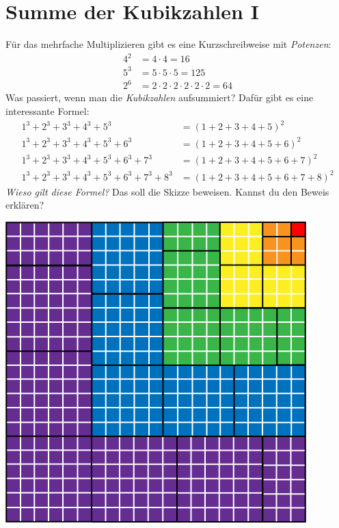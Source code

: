 \documentclass[a5paper,ngerman,landscape,11pt]{scrartcl}
\begin{document}
\section*{Summe der Kubikzahlen I}
Für das mehrfache Multiplizieren gibt es eine Kurzschreibweise mit \emph{Potenzen}:
\begin{align*}
  4^2 &= 4 \cdot 4 = 16 \\
  5^3 &= 5 \cdot 5 \cdot 5 = 125 \\
  2^6 &= 2 \cdot 2 \cdot 2 \cdot 2 \cdot 2 \cdot 2 = 64
\end{align*}
Was passiert, wenn man die \emph{Kubikzahlen} aufsummiert? Dafür gibt es
eine interessante Formel:
\begin{align*}
  1^3 + 2^3 + 3^3 + 4^3 + 5^3 \phantom{{} + 6^3 + 7^3 + 8^3} &= (1 + 2 + 3 + 4 + 5)^2 \\
  1^3 + 2^3 + 3^3 + 4^3 + 5^3 + 6^3 \phantom{{} + 7^3 + 8^3} &= (1 + 2 + 3 + 4 + 5 + 6)^2 \\
  1^3 + 2^3 + 3^3 + 4^3 + 5^3 + 6^3 + 7^3 \phantom{{} + 8^3} &= (1 + 2 + 3 + 4 + 5 + 6 + 7)^2 \\
  1^3 + 2^3 + 3^3 + 4^3 + 5^3 + 6^3 + 7^3 + 8^3 &= (1 + 2 + 3 + 4 + 5 + 6 + 7 + 8)^2
\end{align*}
\emph{Wieso gilt diese Formel?} Das soll die Skizze beweisen. Kannst du den
Beweis erklären?
\begin{center}
\includegraphics[scale=0.7]{kubikzahlen-1}
\end{center}
\end{document}
